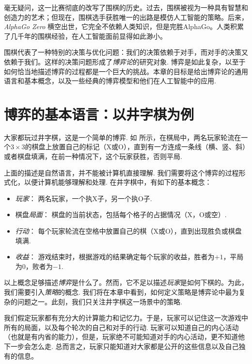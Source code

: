毫无疑问，这一比赛彻底的改写了围棋的历史。过去，围棋被视为一种具有智慧和创造力的艺术；但现在，围棋选手获胜唯一的出路是模仿人工智能的策略。后来，\emph{AlphaGo Zero} 横空出世，它完全不依赖人类知识，但是完胜AlphaGo。人类积累了几千年的围棋经验，在人工智能面前显得如此渺小。

围棋代表了一种特别的决策与优化问题：我们的决策依赖于对手，而对手的决策又依赖于我们。这样的决策问题形成了\emph{博弈论}的研究对象. 博弈是如此复杂，以至于如何恰当地描述博弈的过程都是一个巨大的挑战。本章的目标是给出博弈论的通用语言和基本概念，以及一些经典的博弈模型和他们在人工智能中的应用.

\section{博弈的基本语言：以井字棋为例}\label{sec:game-basic}

大家都玩过井字棋，这是一个简单的博弈. 如 所示，在棋局中，两名玩家轮流在一个$3\times 3$的棋盘上放置自己的标记（X或O），直到有一方连成一条线（横、竖、斜）或者棋盘填满，在前一种情况下，这个玩家获胜，否则平局. 

上面的描述是自然语言，并不能被计算机直接理解. 我们需要将这个博弈的过程形式化，以便计算机能够理解和处理. 在井字棋中，有如下的基本概念：
\begin{itemize}
    \item \emph{玩家}： 两名玩家，一个执X子，另一个执O子.
    \item 棋盘\emph{局面}： 棋盘的当前状态，包括每个格子的占据情况（X，O或空）.
    \item \emph{行动}： 每个玩家轮流在空格中放置自己的棋（X或O），直到出现胜负或棋盘填满.
    \item \emph{收益}： 游戏结束时，根据游戏的结果确定每个玩家的收益，胜者为$+1$，平局为$0$，败者为$-1$.
\end{itemize}

以上概念足够描述\emph{博弈}是什么了。然而，它不足以描述\emph{玩家}是如何下棋的。为此，我们需要引入\emph{策略}的概念. 我们将在本章中看到，如何定义策略是博弈论中最为复杂的问题之一。此刻，我们只关注井字棋这一场景中的策略.

我们假定玩家都有充分大的计算能力和记忆力。于是，玩家可以记住这一次游戏中所有的局面，以及每个轮次的自己和对手的行动. 玩家可以知道自己的内心活动（也就是有内省的能力），但是，玩家绝不可能知道对手的内心活动，更不知道他下一步会怎么走. 总而言之，玩家只能知道对大家都是公开的这些信息以及自己独有的信息。

